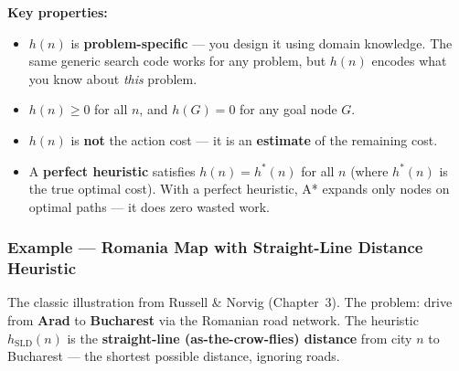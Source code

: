 \documentclass[12pt, a4paper]{article}
\begin{document}
\vspace{0.4em}
\noindent\textbf{Key properties:}
\begin{itemize}[leftmargin=1.5cm, itemsep=2pt, topsep=3pt]
  \item $h(n)$ is \textbf{problem-specific} — you design it using domain knowledge. The same generic search code works for any problem, but $h(n)$ encodes what you know about \emph{this} problem.
  \item $h(n) \geq 0$ for all $n$, and $h(G) = 0$ for any goal node $G$.
  \item $h(n)$ is \textbf{not} the action cost — it is an \textbf{estimate} of the remaining cost.
  \item A \textbf{perfect heuristic} satisfies $h(n) = h^*(n)$ for all $n$ (where $h^*(n)$ is the true optimal cost). With a perfect heuristic, A* expands only nodes on optimal paths — it does zero wasted work.
\end{itemize}

\subsubsection*{Example — Romania Map with Straight-Line Distance Heuristic}

\noindent The classic illustration from Russell \& Norvig (Chapter~3). The problem: drive from \textbf{Arad} to \textbf{Bucharest} via the Romanian road network. The heuristic $h_{\text{SLD}}(n)$ is the \textbf{straight-line (as-the-crow-flies) distance} from city $n$ to Bucharest — the shortest possible distance, ignoring roads.

\vspace{0.6em}
\end{document}
